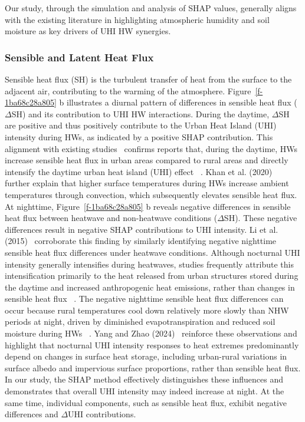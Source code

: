 Our study, through the simulation and analysis of SHAP values, generally aligns with the existing literature in highlighting atmospheric humidity and soil moisture as key drivers of UHI HW synergies. 





\subsubsection*{Sensible and Latent Heat Flux}Sensible heat flux (SH) is the turbulent transfer of heat from the surface to the adjacent air, contributing to the warming of the atmosphere. Figure~\ref{f-1ba68c28a805} b illustrates a diurnal pattern of differences in sensible heat flux (\ensuremath{\Delta }SH) and its contribution to UHI HW interactions. \mbox{}\protect\newline During the daytime, \ensuremath{\Delta }SH are positive and thus positively contribute to the Urban Heat Island (UHI) intensity during HWs, as indicated by a positive SHAP contribution. This alignment with existing studies\unskip~\cite{2755510:33598941,2755510:33598935}  confirms reports that, during the daytime, HWs increase sensible heat flux in urban areas compared to rural areas and directly intensify the daytime urban heat island (UHI) effect\unskip~\cite{2755510:33598935} . Khan et al. (2020)\unskip~\cite{2755510:33598943}  further explain that higher surface temperatures during HWs increase ambient temperatures through convection, which subsequently elevates sensible heat flux. \mbox{}\protect\newline At nighttime, Figure~\ref{f-1ba68c28a805} b reveals negative differences in sensible heat flux between heatwave and non-heatwave conditions (\ensuremath{\Delta }SH). These negative differences result in negative SHAP contributions to UHI intensity. Li et al. (2015)\unskip~\cite{2755510:33598935}  corroborate this finding by similarly identifying negative nighttime sensible heat flux differences under heatwave conditions. Although nocturnal UHI intensity generally intensifies during heatwaves, studies frequently attribute this intensification primarily to the heat released from urban structures stored during the daytime and increased anthropogenic heat emissions, rather than changes in sensible heat flux\unskip~\cite{2755510:33598928} . The negative nighttime sensible heat flux differences can occur because rural temperatures cool down relatively more slowly than NHW periods at night, driven by diminished evapotranspiration and reduced soil moisture during HWs\unskip~\cite{2755510:33598893} . Yang and Zhao (2024)\unskip~\cite{2755510:33598892}  reinforce these observations and highlight that nocturnal UHI intensity responses to heat extremes predominantly depend on changes in surface heat storage, including urban-rural variations in surface albedo and impervious surface proportions, rather than sensible heat flux. In our study, the SHAP method effectively distinguishes these influences and demonstrates that overall UHI intensity may indeed increase at night. At the same time, individual components, such as sensible heat flux, exhibit negative differences and  \ensuremath{\Delta }UHI contributions.



